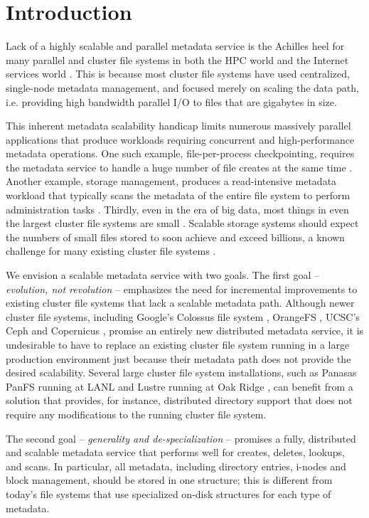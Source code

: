 \section{Introduction}
Lack of a highly scalable and parallel metadata service is the
Achilles heel for many parallel and cluster file systems in both the HPC world
\cite{hpcs-io:2008, hecfsio:tr06} and the Internet services world \cite{HDFS}.
This is because most cluster file systems have used centralized, single-node
metadata management, and focused merely on scaling the data path,
i.e. providing high bandwidth parallel I/O to files that are gigabytes in size.


This inherent metadata scalability handicap limits numerous massively parallel
applications that produce workloads
requiring concurrent and high-performance metadata operations.
One such example, file-per-process checkpointing, requires the metadata service to
handle a huge number of file creates at the same time \cite{PLFS}.
Another example, storage management, produces a read-intensive metadata workload
that typically scans the metadata of the entire file system to perform
administration tasks \cite{filemgmt-ucsc, magellan-ucsc}.
Thirdly, even in the era of big data,
most things in even the largest cluster file systems are small
\cite{Dayal, brent13}.
Scalable storage systems should expect the numbers of small files stored
to soon achieve and exceed billions,
a known challenge for many existing cluster file systems \cite{GIGA11}.

We envision a scalable metadata service with two goals.
The first goal -- \textit{evolution, not revolution} -- emphasizes the need for
incremental improvements to existing cluster file systems that lack a
scalable metadata path.
Although newer cluster file systems, including Google's Colossus file system
\cite{50mfiles-in-googlefs:fikes10}, OrangeFS \cite{OrangeFS}, UCSC's Ceph \cite{ceph:weil06} and 
Copernicus \cite{sfs-ucsc}, promise an entirely new distributed metadata
service, it is undesirable to have to replace an existing cluster file system
running in a large production environment
just because their metadata path does not provide the desired scalability.
Several large cluster file system installations, such as Panasas PanFS running
at LANL \cite{PanFS} and Lustre running at Oak Ridge
\cite{shipman2010, wang09}, can benefit from a solution that provides,
for instance, distributed directory support
that does not require any modifications to the running cluster file system.

The second goal -- \textit{generality and de-specialization} -- promises a
fully, distributed and scalable metadata service
that performs well for creates, deletes, lookups, and scans.
In particular, all metadata, including directory entries, i-nodes and block
management, should be stored in one structure; this is different from
today's file systems that use specialized on-disk structures for each type of
metadata.

